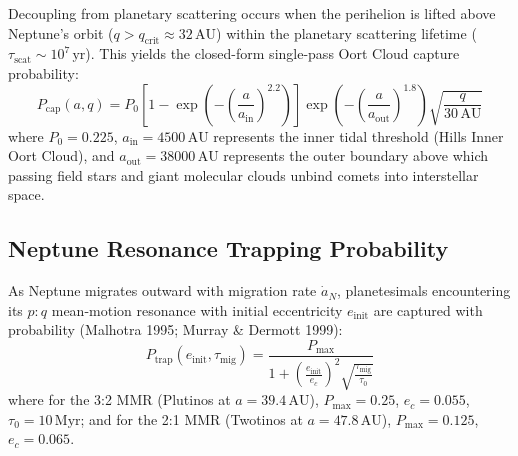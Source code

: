 \documentclass[11pt,a4paper]{article}
\begin{document}
Decoupling from planetary scattering occurs when the perihelion is lifted above Neptune's orbit ($q > q_{\text{crit}} \approx 32\,\text{AU}$) within the planetary scattering lifetime ($\tau_{\text{scat}} \sim 10^7\,\text{yr}$). This yields the closed-form single-pass Oort Cloud capture probability:
\begin{equation}
P_{\text{cap}}(a, q) = P_0 \left[ 1 - \exp\left(-\left(\frac{a}{a_{\text{in}}}\right)^{2.2}\right) \right] \exp\left(-\left(\frac{a}{a_{\text{out}}}\right)^{1.8}\right) \sqrt{\frac{q}{30\,\text{AU}}}
\label{eq:p_cap}
\end{equation}
where $P_0 = 0.225$, $a_{\text{in}} = 4500\,\text{AU}$ represents the inner tidal threshold (Hills Inner Oort Cloud), and $a_{\text{out}} = 38000\,\text{AU}$ represents the outer boundary above which passing field stars and giant molecular clouds unbind comets into interstellar space.

\subsection{Neptune Resonance Trapping Probability}
As Neptune migrates outward with migration rate $\dot{a}_N$, planetesimals encountering its $p:q$ mean-motion resonance with initial eccentricity $e_{\text{init}}$ are captured with probability (Malhotra 1995; Murray \& Dermott 1999):
\begin{equation}
P_{\text{trap}}(e_{\text{init}}, \tau_{\text{mig}}) = \frac{P_{\text{max}}}{1 + \left(\frac{e_{\text{init}}}{e_c}\right)^2 \sqrt{\frac{\tau_{\text{mig}}}{\tau_0}}}
\label{eq:p_trap}
\end{equation}
where for the 3:2 MMR (Plutinos at $a = 39.4\,\text{AU}$), $P_{\text{max}} = 0.25$, $e_c = 0.055$, $\tau_0 = 10\,\text{Myr}$; and for the 2:1 MMR (Twotinos at $a = 47.8\,\text{AU}$), $P_{\text{max}} = 0.125$, $e_c = 0.065$.
\end{document}
